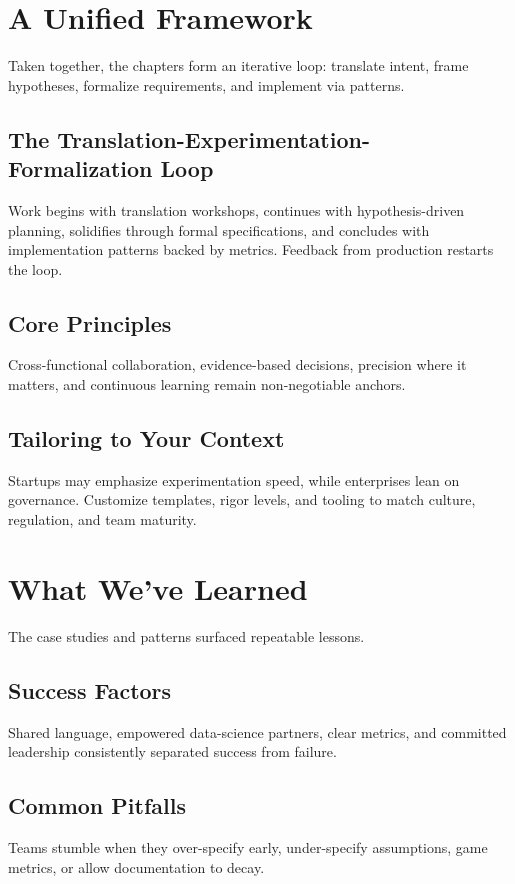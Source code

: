 \section{A Unified Framework}
\label{sec:unified-framework}

Taken together, the chapters form an iterative loop: translate intent, frame hypotheses, formalize requirements, and implement via patterns.

\subsection{The Translation-Experimentation-Formalization Loop}
Work begins with translation workshops, continues with hypothesis-driven planning, solidifies through formal specifications, and concludes with implementation patterns backed by metrics. Feedback from production restarts the loop.

\subsection{Core Principles}
Cross-functional collaboration, evidence-based decisions, precision where it matters, and continuous learning remain non-negotiable anchors.

\subsection{Tailoring to Your Context}
Startups may emphasize experimentation speed, while enterprises lean on governance. Customize templates, rigor levels, and tooling to match culture, regulation, and team maturity.

\section{What We've Learned}
\label{sec:learned}

The case studies and patterns surfaced repeatable lessons.

\subsection{Success Factors}
Shared language, empowered data-science partners, clear metrics, and committed leadership consistently separated success from failure.

\subsection{Common Pitfalls}
Teams stumble when they over-specify early, under-specify assumptions, game metrics, or allow documentation to decay.

